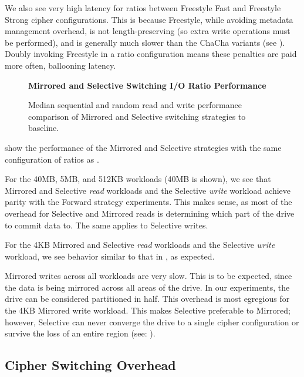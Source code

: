We also see very high latency for ratios between Freestyle Fast and Freestyle
Strong cipher configurations. This is because Freestyle, while avoiding metadata
management overhead, is not length-preserving (so extra write operations must be
performed), and is generally much slower than the ChaCha variants (see
). Doubly invoking Freestyle in a ratio configuration
means these penalties are paid more often, ballooning latency.

\begin{figure}[ht]
  \textbf{Mirrored and Selective Switching I/O Ratio Performance}\par\medskip
  \centering
  {} \caption{Median sequential and
  random read and write performance comparison of Mirrored and Selective
  switching strategies to baseline.}
 \label{fig:mirrored-selective-baseline}
\end{figure}

 show the performance of the Mirrored and
Selective strategies with the same configuration of ratios as
.

For the 40MB, 5MB, and 512KB workloads (40MB is shown), we see that Mirrored and
Selective \emph{read} workloads and the Selective \emph{write} workload achieve
parity with the Forward strategy experiments. This makes sense, as most of the
overhead for Selective and Mirrored reads is determining which part of the drive
to commit data to. The same applies to Selective writes.

For the 4KB Mirrored and Selective \emph{read} workloads and the Selective
\emph{write} workload, we see behavior similar to that in
, as expected.

Mirrored writes across all workloads are very slow. This is to be expected,
since the data is being mirrored across all areas of the drive. In our
experiments, the drive can be considered partitioned in half. This overhead is
most egregious for the 4KB Mirrored write workload. This makes Selective
preferable to Mirrored; however, Selective can never converge the drive to a
single cipher configuration or survive the loss of an entire region (see:
).

\subsection{Cipher Switching Overhead} \label{subsec:3}

